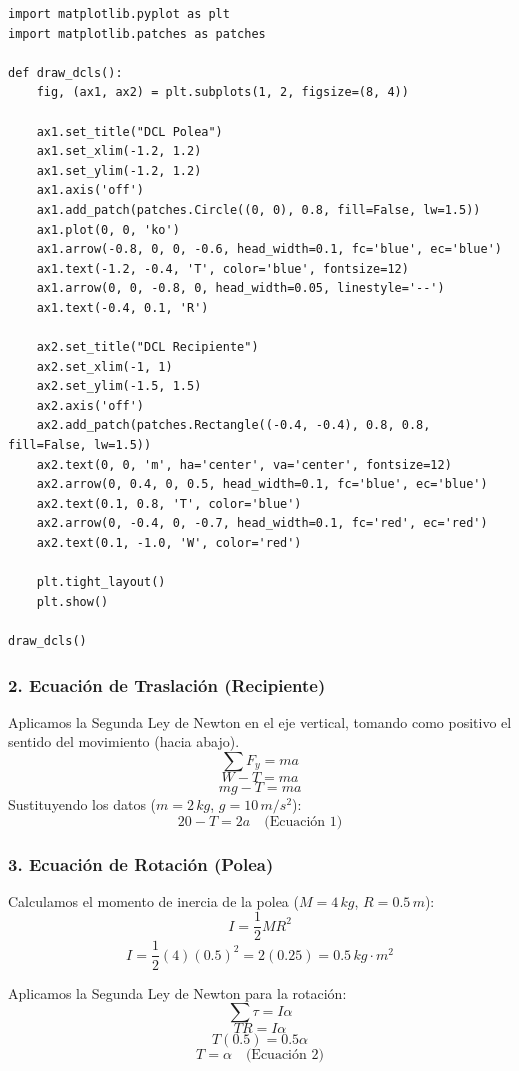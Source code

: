 \documentclass[12pt, a4paper]{article}
\begin{document}
\begin{lstlisting}
import matplotlib.pyplot as plt
import matplotlib.patches as patches

def draw_dcls():
    fig, (ax1, ax2) = plt.subplots(1, 2, figsize=(8, 4))
    
    ax1.set_title("DCL Polea")
    ax1.set_xlim(-1.2, 1.2)
    ax1.set_ylim(-1.2, 1.2)
    ax1.axis('off')
    ax1.add_patch(patches.Circle((0, 0), 0.8, fill=False, lw=1.5))
    ax1.plot(0, 0, 'ko')
    ax1.arrow(-0.8, 0, 0, -0.6, head_width=0.1, fc='blue', ec='blue')
    ax1.text(-1.2, -0.4, 'T', color='blue', fontsize=12)
    ax1.arrow(0, 0, -0.8, 0, head_width=0.05, linestyle='--')
    ax1.text(-0.4, 0.1, 'R')

    ax2.set_title("DCL Recipiente")
    ax2.set_xlim(-1, 1)
    ax2.set_ylim(-1.5, 1.5)
    ax2.axis('off')
    ax2.add_patch(patches.Rectangle((-0.4, -0.4), 0.8, 0.8, fill=False, lw=1.5))
    ax2.text(0, 0, 'm', ha='center', va='center', fontsize=12)
    ax2.arrow(0, 0.4, 0, 0.5, head_width=0.1, fc='blue', ec='blue')
    ax2.text(0.1, 0.8, 'T', color='blue')
    ax2.arrow(0, -0.4, 0, -0.7, head_width=0.1, fc='red', ec='red')
    ax2.text(0.1, -1.0, 'W', color='red')
    
    plt.tight_layout()
    plt.show()

draw_dcls()
\end{lstlisting}

\subsubsection*{2. Ecuación de Traslación (Recipiente)}
Aplicamos la Segunda Ley de Newton en el eje vertical, tomando como positivo el sentido del movimiento (hacia abajo).
$$\sum F_y = m a$$
$$W - T = m a$$
$$m g - T = m a$$
Sustituyendo los datos ($m = 2 \, \si{kg}$, $g = 10 \, \si{m/s^2}$):
$$20 - T = 2 a \quad \text{(Ecuación 1)}$$

\subsubsection*{3. Ecuación de Rotación (Polea)}
Calculamos el momento de inercia de la polea ($M = 4 \, \si{kg}$, $R = 0.5 \, \si{m}$):
$$I = \frac{1}{2} M R^2$$
$$I = \frac{1}{2} (4) (0.5)^2 = 2 (0.25) = 0.5 \, \si{kg\cdot m^2}$$

Aplicamos la Segunda Ley de Newton para la rotación:
$$\sum \tau = I \alpha$$
$$T R = I \alpha$$
$$T (0.5) = 0.5 \alpha$$
$$T = \alpha \quad \text{(Ecuación 2)}$$
\end{document}
